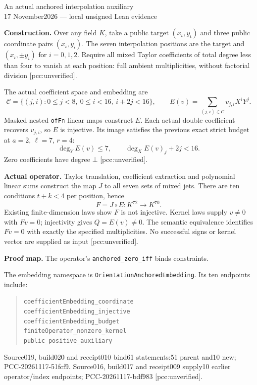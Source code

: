 \documentclass[10pt]{article}
\begin{document}
\begin{center}{\Large An actual anchored interpolation auxiliary}\\[4pt]
17 November2026 --- local unsigned Lean evidence\end{center}
\textbf{Construction.} Over any field $K$, take a public target $(x_t,y_t)$
and three public coordinate pairs $(x_i,y_i)$. The seven interpolation
positions are the target and $(x_i,\pm y_i)$ for $i=0,1,2$.
Require all mixed Taylor coefficients of total degree less than four
to vanish at each position: full ambient multiplicities,
without factorial division [pcc:unverified].

The actual coefficient space and embedding are
\[
 \mathcal C=\{(j,i):0\le j<8,\ 0\le i<16,\ i+2j<16\},\qquad
 E(v)=\sum_{(j,i)\in\mathcal C}v_{j,i}X^iY^j.
\]
Masked nested \texttt{ofFn} linear maps construct $E$.
Each actual double coefficient recovers $v_{j,i}$, so $E$ is injective.
Its image satisfies the previous exact strict budget at
$a=2$, $\ell=7$, $r=4$:
\[
 \deg_Y E(v)\le7,\qquad \deg_X E(v)_j+2j<16.
\]
Zero coefficients have degree $\bot$ [pcc:unverified].

\textbf{Actual operator.}
Taylor translation, coefficient extraction and polynomial linear sums
construct the map $J$ to all seven sets of mixed jets.
There are ten conditions $t+k<4$ per position, hence
\[
 F=J\circ E:K^{72}\longrightarrow K^{70}.
\]
Existing finite-dimension laws show $F$ is not injective.
Kernel laws supply $v\ne0$ with $Fv=0$; injectivity gives $Q=E(v)\ne0$.
The semantic equivalence identifies $Fv=0$ with exactly the specified
multiplicities. No successful signs or kernel vector are supplied as input
[pcc:unverified].

\textbf{Proof map.} The operator's \texttt{anchored\_zero\_iff} binds constraints.

The embedding namespace is \texttt{OrientationAnchoredEmbedding}.
Its ten endpoints include:
\begin{quote}\small
\texttt{coefficientEmbedding\_coordinate}\\
\texttt{coefficientEmbedding\_injective}\\
\texttt{coefficientEmbedding\_budget}\\
\texttt{finiteOperator\_nonzero\_kernel}\\
\texttt{public\_positive\_auxiliary}
\end{quote}
Source019, build020 and receipt010 bind61 statements:51 parent and10 new;
PCC-20261117-51fcf9. Source016, build017 and receipt009 supply10 earlier
operator/index endpoints; PCC-20261117-bdf983 [pcc:unverified].
\end{document}
